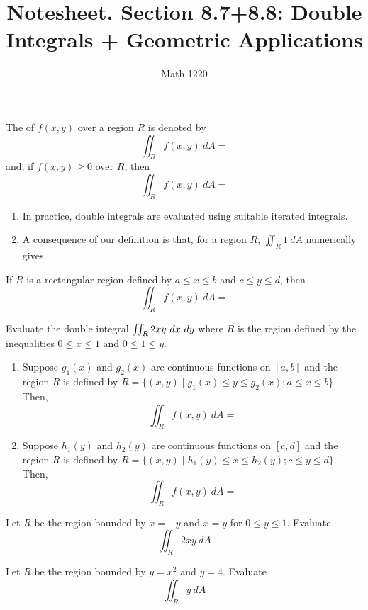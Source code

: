 \documentclass[12pt, a4paper]{article}
\author{Math 1220}
\title{Notesheet. Section 8.7+8.8: Double Integrals + Geometric Applications}
\date{}
\begin{document}
\maketitle
\nameline
\begin{defi}
  The  of \(f(x,y)\) over a region \(R\) is
  denoted by \[
    \iint_R f(x,y)\ dA = 
  \]
  and, if \(f(x,y) \geq 0\) over \(R\), then \[
    \iint_R f(x,y)\ dA = 
  \]
\end{defi}
\begin{rmk}
  \begin{enumerate}
  \item In practice, double integrals are evaluated using suitable iterated
  integrals. 
  \item A consequence of our definition is that, for a region \(R\),
    \(\iint_R 1\ dA\) numerically gives
  \end{enumerate}
\end{rmk}
\begin{thrm}
  If \(R\) is a rectangular region defined by \(a \leq x \leq b\) and
  \(c \leq y \leq d\), then \[
    \iint_R f(x,y)\ dA = 
  \]
\end{thrm}
\begin{ex}
  Evaluate the double integral \(\iint_R 2xy \ d x\ dy\) where \(R\) is
  the region defined by the inequalities \(0 \leq x \leq 1\) and \(0
  \leq 1 \leq y\).
\end{ex}
\begin{thrm}
  \begin{enumerate}
  \item   Suppose \(g_1(x)\) and \(g_2(x)\) are continuous functions on
  \([a,b]\) and the region \(R\) is defined by \(R = \{(x,y) \mid
  g_1(x) \leq y \leq g_2(x); a \leq x \leq b\}\). Then, \[
    \iint_R f(x,y)\ dA = 
  \]
  \item Suppose \(h_1(y)\) and \(h_2(y)\) are continuous functions on
    \([c,d]\) and the region \(R\) is defined by \(R = \{(x,y) \mid
    h_1(y) \leq x \leq h_2(y); c \leq y \leq d\}\). Then, \[
      \iint_R f(x,y)\ dA = 
    \]
  \end{enumerate}
\end{thrm}
\begin{ex}
  Let \(R\) be the region bounded by \(x=-y\) and \(x=y\) for \(0 \leq
  y \leq 1\). Evaluate \[
    \iint_R 2xy\ dA
  \]
\end{ex}
\begin{ex}
  Let \(R\) be the region bounded by \(y=x^2\) and
  \(y=4\). Evaluate \[
    \iint_R y\ dA
  \]
\end{ex}
\end{document}
